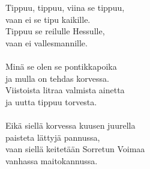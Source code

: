 
Tippuu, tippuu, viina se tippuu, \\ vaan ei se tipu kaikille. \\ Tippuu se reilulle Hessulle,  \\ vaan ei vallesmannille. \\ \hspace{10mm} \\ Minä se olen se pontikkapoika \\ ja mulla on tehdas korvessa. \\ Viistoista litraa valmista ainetta \\ ja uutta tippuu torvesta. \\ \hspace{10mm} \\ Eikä siellä korvessa kuusen juurella \\ paisteta lättyjä pannussa, \\ vaan siellä keitetään Sorretun Voimaa \\ vanhassa maitokannussa.